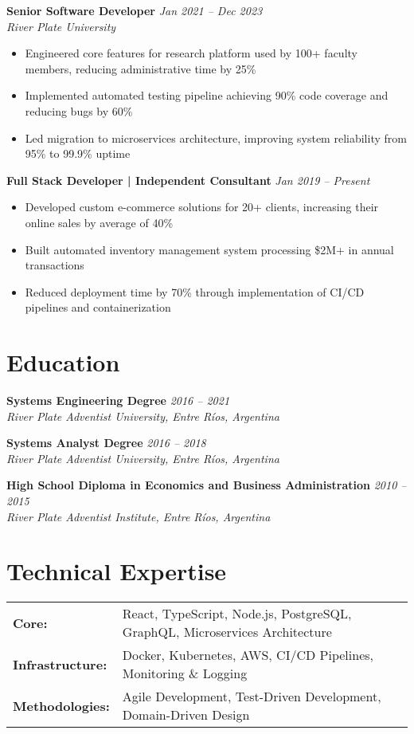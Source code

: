 \documentclass[11pt,a4paper]{article}
\begin{document}
\noindent\textbf{Senior Software Developer} \hfill \textit{Jan 2021 -- Dec 2023}\\
\textit{River Plate University}
\begin{itemize}[leftmargin=*]
\item Engineered core features for research platform used by 100+ faculty members, reducing administrative time by 25\%
\item Implemented automated testing pipeline achieving 90\% code coverage and reducing bugs by 60\%
\item Led migration to microservices architecture, improving system reliability from 95\% to 99.9\% uptime
\end{itemize}

\noindent\textbf{Full Stack Developer | Independent Consultant} \hfill \textit{Jan 2019 -- Present}
\begin{itemize}[leftmargin=*]
\item Developed custom e-commerce solutions for 20+ clients, increasing their online sales by average of 40\%
\item Built automated inventory management system processing \$2M+ in annual transactions
\item Reduced deployment time by 70\% through implementation of CI/CD pipelines and containerization
\end{itemize}

\section{Education}
\noindent\textbf{Systems Engineering Degree} \hfill \textit{2016 -- 2021}\\
\textit{River Plate Adventist University, Entre Ríos, Argentina}

\noindent\textbf{Systems Analyst Degree} \hfill \textit{2016 -- 2018}\\
\textit{River Plate Adventist University, Entre Ríos, Argentina}

\noindent\textbf{High School Diploma in Economics and Business Administration} \hfill \textit{2010 -- 2015}\\
\textit{River Plate Adventist Institute, Entre Ríos, Argentina}

\section{Technical Expertise}
\begin{tabular}{@{} l p{} @{}}
\textbf{Core:} & React, TypeScript, Node.js, PostgreSQL, GraphQL, Microservices Architecture \\
\textbf{Infrastructure:} & Docker, Kubernetes, AWS, CI/CD Pipelines, Monitoring \& Logging \\
\textbf{Methodologies:} & Agile Development, Test-Driven Development, Domain-Driven Design
\end{tabular}
\end{document}
